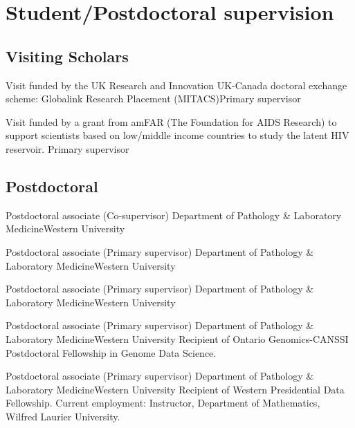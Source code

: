 
\section {Student/Postdoctoral supervision}

\subsection {Visiting Scholars}

{Visit funded by the UK Research and Innovation UK-Canada doctoral exchange scheme: Globalink Research Placement (MITACS)}{}{Primary supervisor}

{Visit funded by a grant from amFAR (The Foundation for AIDS Research) to support scientists based on low/middle income countries to study the latent HIV reservoir.}
{}{Primary supervisor}



\subsection {Postdoctoral}

{Postdoctoral associate (Co-supervisor)}
{Department of Pathology \& Laboratory Medicine}{Western University}
{}

{Postdoctoral associate (Primary supervisor)}
{Department of Pathology \& Laboratory Medicine}{Western University}
{}

{Postdoctoral associate (Primary supervisor)}
{Department of Pathology \& Laboratory Medicine}{Western University}
{}


{Postdoctoral associate (Primary supervisor)}
{Department of Pathology \& Laboratory Medicine}{Western University}
{Recipient of Ontario Genomics-CANSSI Postdoctoral Fellowship in Genome Data Science.}


{Postdoctoral associate (Primary supervisor)}
{Department of Pathology \& Laboratory Medicine}{Western University}
{Recipient of Western Presidential Data Fellowship.  Current employment: Instructor, Department of Mathematics, Wilfred Laurier University.}


